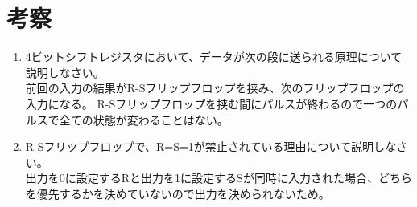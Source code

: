 \documentclass[dvipdfmx]{jsarticle}
\begin{document}
	\section{考察}
		\begin{enumerate}
			\item 4ビットシフトレジスタにおいて、データが次の段に送られる原理について説明しなさい。\\
				前回の入力の結果がR-Sフリップフロップを挟み、次のフリップフロップの入力になる。
				R-Sフリップフロップを挟む間にパルスが終わるので一つのパルスで全ての状態が変わることはない。
			\item R-Sフリップフロップで、R=S=1が禁止されている理由について説明しなさい。\\
				出力を0に設定するRと出力を1に設定するSが同時に入力された場合、どちらを優先するかを決めていないので出力を決められないため。
		\end{enumerate}
\end{document}
